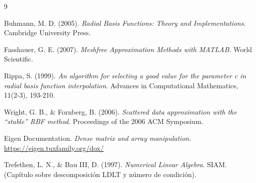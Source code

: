 \documentclass[12pt,a4paper]{article}
\theoremstyle{definition}
\begin{document}
\begin{thebibliography}{9}

 Buhmann, M. D. (2005). \textit{Radial Basis Functions: Theory and Implementations}. Cambridge University Press.

 Fasshauer, G. E. (2007). \textit{Meshfree Approximation Methods with MATLAB}. World Scientific.

 Rippa, S. (1999). \textit{An algorithm for selecting a good value for the parameter c in radial basis function interpolation}. Advances in Computational Mathematics, 11(2-3), 193-210.

 Wright, G. B., \& Fornberg, B. (2006). \textit{Scattered data approximation with the ``stable'' RBF method}. Proceedings of the 2006 ACM Symposium.

 Eigen Documentation. \textit{Dense matrix and array manipulation}. \url{https://eigen.tuxfamily.org/dox/}

 Trefethen, L. N., \& Bau III, D. (1997). \textit{Numerical Linear Algebra}. SIAM. (Cap\'{i}tulo sobre descomposici\'{o}n LDLT y n\'{u}mero de condici\'{o}n).

\end{thebibliography}
\end{document}
